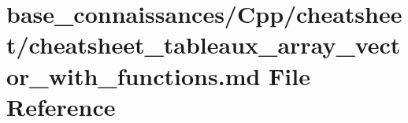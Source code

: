 \hypertarget{base__connaissances_2Cpp_2cheatsheet_2cheatsheet__tableaux__array__vector__with__functions_8md}{}\section{base\+\_\+connaissances/\+Cpp/cheatsheet/cheatsheet\+\_\+tableaux\+\_\+array\+\_\+vector\+\_\+with\+\_\+functions.md File Reference}
\label{base__connaissances_2Cpp_2cheatsheet_2cheatsheet__tableaux__array__vector__with__functions_8md}
